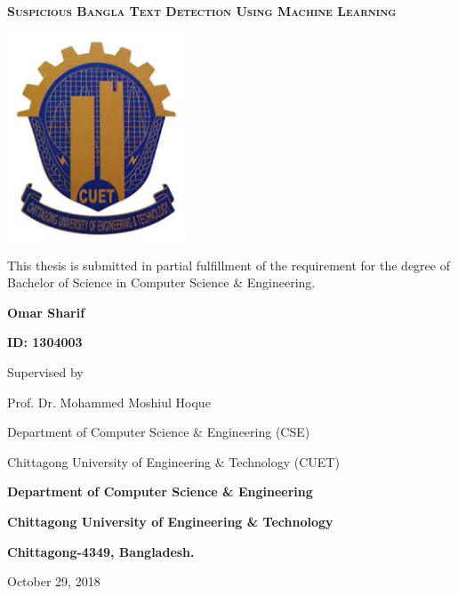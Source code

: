 \begin{titlepage}
	\centering
	{\scshape\Large\bfseries Suspicious Bangla Text Detection Using Machine Learning\par}
	\vspace{1cm}
	\includegraphics[width=0.4\textwidth]{Figures/Logo.jpeg}\par\vspace{1cm}
	\vspace{1cm}
	 This thesis is submitted in partial fulfillment of the requirement for the degree of Bachelor of Science in Computer Science \& Engineering.
	
	\vspace{2cm}
	\textbf{Omar Sharif}\par 
	\vspace{.5cm}
	\textbf{ID: 1304003}\par 
	
	\vspace{2cm}
	Supervised by\par 
	Prof. Dr. Mohammed Moshiul Hoque\par 
	Department of Computer Science \& Engineering (CSE)\par 
	Chittagong University of Engineering \& Technology (CUET)
	
	\vspace{1.5cm}
	{\Large\bfseries Department of Computer Science \& Engineering\par}
	{\large\bfseries Chittagong University of Engineering \& Technology\par}
	{\bfseries Chittagong-4349, Bangladesh.}

	\vfill
	{\large October 29, 2018\par}
\end{titlepage}

\setcounter{secnumdepth}{-1}

